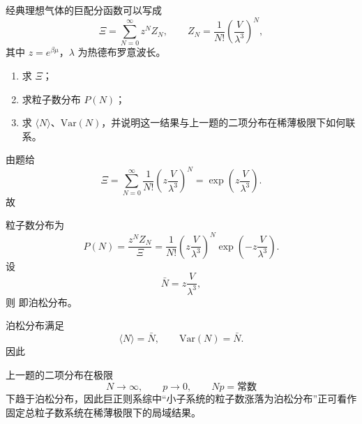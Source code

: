 \begin{question}[16分]
经典理想气体的巨配分函数可以写成
\[
\Xi=\sum_{N=0}^{\infty} z^N Z_N,
\qquad
Z_N=\frac{1}{N!}\left(\frac{V}{\lambda^3}\right)^N,
\]
其中 $z=e^{\beta\mu}$，$\lambda$ 为热德布罗意波长。
\begin{enumerate}[label=（\arabic*）,leftmargin=2.8em,itemsep=0.2em]
\item 求 $\Xi$；
\item 求粒子数分布 $P(N)$；
\item 求 $\langle N\rangle$、$\mathrm{Var}(N)$，并说明这一结果与上一题的二项分布在稀薄极限下如何联系。
\end{enumerate}
\begin{solution}

由题给
\[
\Xi=\sum_{N=0}^{\infty}\frac{1}{N!}\left(z\frac{V}{\lambda^3}\right)^N
=\exp\!\left(z\frac{V}{\lambda^3}\right).
\]
故

粒子数分布为
\[
P(N)=\frac{z^N Z_N}{\Xi}
=\frac{1}{N!}\left(z\frac{V}{\lambda^3}\right)^N
\exp\!\left(-z\frac{V}{\lambda^3}\right).
\]
设
\[
\bar N=z\frac{V}{\lambda^3},
\]
则
即泊松分布。

泊松分布满足
\[
\langle N\rangle=\bar N,\qquad
\mathrm{Var}(N)=\bar N.
\]
因此

上一题的二项分布在极限
\[
N\to\infty,\qquad p\to0,\qquad Np=\text{常数}
\]
下趋于泊松分布，因此巨正则系综中“小子系统的粒子数涨落为泊松分布”正可看作固定总粒子数系统在稀薄极限下的局域结果。
\end{solution}
\end{question}


